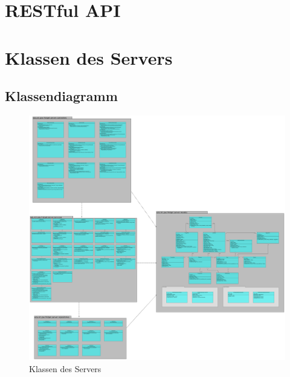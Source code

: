 \documentclass[a4paper]{scrreprt}
\begin{document}
	
	    
	\clearpage
	
	\clearpage
	
	\clearpage
	
	\clearpage
	\section{RESTful API}
	
	\clearpage
	\section{Klassen des Servers}
		\subsection{Klassendiagramm}
		\begin{figure}[H]
	       \centering
	       \includegraphics[scale = .10]{server-packages.png}
	       \caption{Klassen des Servers}
	      \end{figure}

	
 
 
\end{document}
